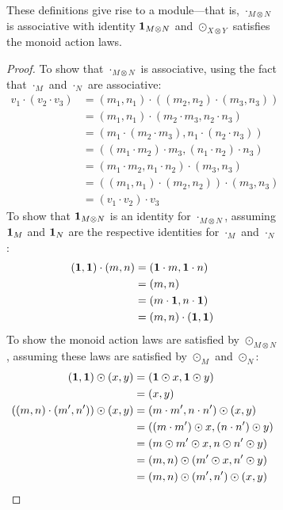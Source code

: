 \begin{figure}
\begin{figure}
\iffull
\begin{lemma}
    These definitions give rise to a module---that is, $\cdot_{M \otimes N}$
    is associative with identity $\mbox{\bf{1}}_{M \otimes N}$ and $\odot_{X \otimes Y}$
    satisfies the monoid action laws.
\end{lemma}
\begin{proof}
    To show that $\cdot_{M \otimes N}$ is associative, using the fact that
    $\cdot_M$ and $\cdot_N$ are associative:
    \begin{align*}
        v_1 \cdot (v_2 \cdot v_3)
            &= (m_1,n_1) \cdot ((m_2,n_2) \cdot (m_3,n_3)) \\
            &= (m_1,n_1) \cdot (m_2 \cdot m_3,n_2 \cdot n_3) \\
            &= (m_1\cdot(m_2 \cdot m_3),n_1\cdot(n_2 \cdot n_3)) \\
            &= ((m_1 \cdot m_2) \cdot m_3,(n_1 \cdot n_2) \cdot n_3) \\
            &= (m_1 \cdot m_2, n_1 \cdot n_2)\cdot(m_3,n_3) \\
            &= ((m_1,n_1) \cdot (m_2,n_2)) \cdot (m_3,n_3) \\
            &= (v_1 \cdot v_2) \cdot v_3
    \end{align*}
    To show that $\mbox{\bf{1}}_{M \otimes N}$ is an identity for $\cdot_{M \otimes
    N}$, assuming $\mbox{\bf{1}}_M$ and $\mbox{\bf{1}}_N$ are the respective identities for
    $\cdot_M$ and $\cdot_N$:
    \begin{align*}
        (\mbox{\bf{1}},\mbox{\bf{1}})\cdot(m,n)
            &= (\mbox{\bf{1}} \cdot m,\mbox{\bf{1}} \cdot n) \\
            &= (m,n) \\
            &= (m \cdot \mbox{\bf{1}},n \cdot \mbox{\bf{1}}) \\
            &= (m,n) \cdot (\mbox{\bf{1}}, \mbox{\bf{1}})
    \end{align*}
    To show the monoid action laws are satisfied by $\odot_{M \otimes N}$,
    assuming these laws are satisfied by $\odot_M$ and $\odot_N$:
    \begin{align*}
        (\mbox{\bf{1}},\mbox{\bf{1}}) \odot (x,y)
            &= (\mbox{\bf{1}} \odot x, \mbox{\bf{1}} \odot y) \\
            &= (x,y) \\
        ((m,n)\cdot(m',n'))\odot(x,y)
            &= (m \cdot m',n \cdot n')\odot(x,y) \\
            &= ((m \cdot m') \odot x,(n \cdot n') \odot y) \\
            &= (m \odot m' \odot x,n \odot n' \odot y) \\
            &= (m,n) \odot (m' \odot x,n' \odot y) \\
            &= (m,n) \odot (m',n') \odot (x,y)
    \end{align*}
\end{proof}
\fi


\end{figure}
\end{figure}
